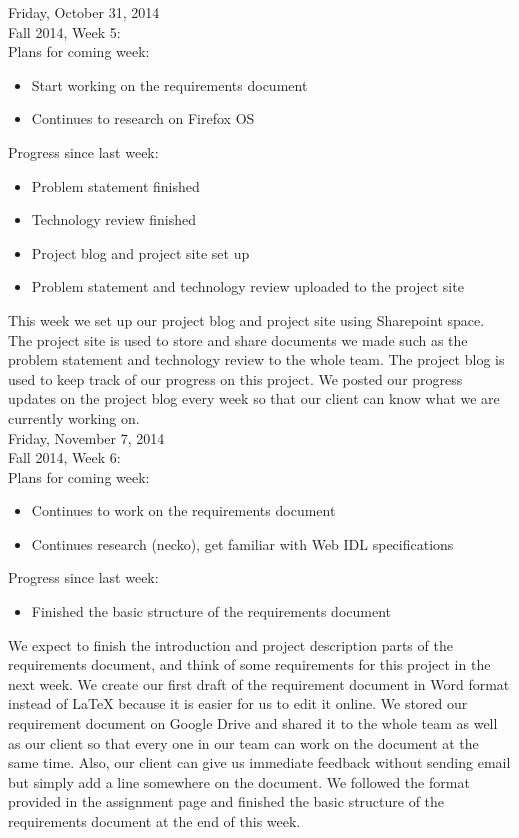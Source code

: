 Friday, October 31, 2014 \\
Fall 2014, Week 5: \\

Plans for coming week:
\begin{itemize}
\item Start working on the requirements document​
\item Continues to research on Firefox OS
\end{itemize}

Progress since last week:
\begin{itemize}
\item Problem statement finished
\item Technology review​ finished
\item Project blog and project site set ​up​
\item Problem statement and technology review​​ uploaded to the project site
\end{itemize}

This week we set up our project blog and project site using Sharepoint space. The project site is used to store and share documents we made such as the problem statement and technology review​​ to the whole team. The project blog is used to keep track of our progress on this project. We posted our progress updates on the project blog every week so that our client can know what we are currently working on.​ \\

Friday, November 7, 2014 \\
​Fall 2014, Week 6: \\

Plans for coming week:
\begin{itemize}
\item Continues to work on the requirements document
\item Continues research (necko), get familiar with Web IDL specifications
\end{itemize}

Progress since last week:​
\begin{itemize}
\item Finished the basic structure of the requirements document​
\end{itemize}

We expect to finish the introduction and project description parts of the requirements document, and think of some requirements for this project in the next week. We create our first draft of the requirement document in Word format instead of LaTeX because it is easier for us to edit it online. We stored our requirement document on Google Drive and shared it to the whole team as well as our client so that every one in our team can work on the document at the same time. Also, our client can give us immediate feedback without sending email but simply add a line somewhere on the document. We followed the format provided in the assignment page and finished the basic structure of the requirements document at the end of this week.

